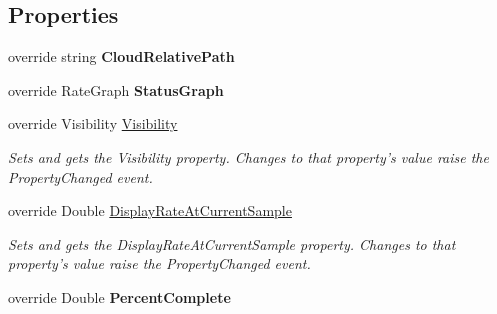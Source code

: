\subsection*{Properties}
\begin{DoxyCompactItemize}
\item 
\hypertarget{class_cloud_api_public_1_1_event_message_receiver_1_1_status_1_1_c_l_status_file_transfer_a3e66b1fa29b8ac288417067adaf8ce09}{override string {\bfseries Cloud\-Relative\-Path}}\label{class_cloud_api_public_1_1_event_message_receiver_1_1_status_1_1_c_l_status_file_transfer_a3e66b1fa29b8ac288417067adaf8ce09}

\item 
\hypertarget{class_cloud_api_public_1_1_event_message_receiver_1_1_status_1_1_c_l_status_file_transfer_a7259ca233f46eb151e82db3324e63aec}{override Rate\-Graph {\bfseries Status\-Graph}}\label{class_cloud_api_public_1_1_event_message_receiver_1_1_status_1_1_c_l_status_file_transfer_a7259ca233f46eb151e82db3324e63aec}

\item 
override Visibility \hyperlink{class_cloud_api_public_1_1_event_message_receiver_1_1_status_1_1_c_l_status_file_transfer_a86c0a97a5c26a27131d350d1089a36f2}{Visibility}
\begin{DoxyCompactList}\small\item\em Sets and gets the Visibility property. Changes to that property's value raise the Property\-Changed event. \end{DoxyCompactList}\item 
override Double \hyperlink{class_cloud_api_public_1_1_event_message_receiver_1_1_status_1_1_c_l_status_file_transfer_a16f8a7d7676dc5dff1d75289a244bf71}{Display\-Rate\-At\-Current\-Sample}
\begin{DoxyCompactList}\small\item\em Sets and gets the Display\-Rate\-At\-Current\-Sample property. Changes to that property's value raise the Property\-Changed event. \end{DoxyCompactList}\item 
\hypertarget{class_cloud_api_public_1_1_event_message_receiver_1_1_status_1_1_c_l_status_file_transfer_aae5a828375c9d0d900917b08b2b5a006}{override Double {\bfseries Percent\-Complete}}\label{class_cloud_api_public_1_1_event_message_receiver_1_1_status_1_1_c_l_status_file_transfer_aae5a828375c9d0d900917b08b2b5a006}


\end{DoxyCompactItemize}
